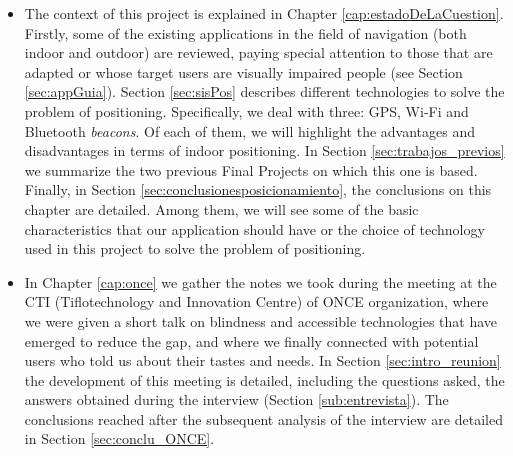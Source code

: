\begin{itemize}
	
	\item The context of this project is explained in Chapter \ref{cap:estadoDeLaCuestion}. Firstly, some of the existing applications in the field of navigation (both indoor and outdoor) are reviewed, paying special attention to those that are adapted or whose target users are visually impaired people (see Section \ref{sec:appGuia}). Section \ref{sec:sisPos} describes different technologies to solve the problem of positioning. Specifically, we deal with three: GPS, Wi-Fi and Bluetooth \textit{beacons}. Of each of them, we will highlight the advantages and disadvantages in terms of indoor positioning. In Section \ref{sec:trabajos_previos} we summarize the two previous Final Projects on which this one is based. Finally, in Section \ref{sec:conclusionesposicionamiento}, the conclusions on this chapter are detailed. Among them, we will see some of the basic characteristics that our application should have or the choice of technology used in this project to solve the problem of positioning. 
	
	\item In Chapter \ref{cap:once} we gather the notes we took during the meeting at the CTI (Tiflotechnology and Innovation Centre) of ONCE organization, where we were given a short talk on blindness and accessible technologies that have emerged to reduce the gap, and where we finally connected with potential users who told us about their tastes and needs. In Section \ref{sec:intro_reunion} the development of this meeting is detailed, including the questions asked, the answers obtained during the interview (Section \ref{sub:entrevista}). The conclusions reached after the subsequent analysis of the interview are detailed in Section \ref{sec:conclu_ONCE}. 
	

\end{itemize}
